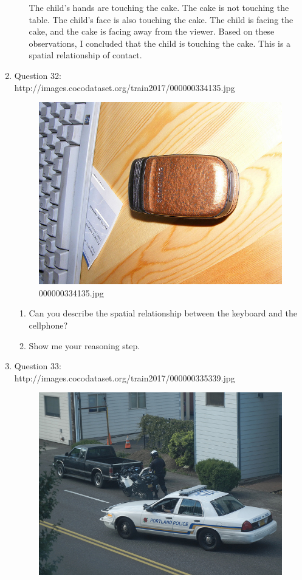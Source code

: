 \begin{enumerate}
\begin{enumerate}
        The child's hands are touching the cake.
        The cake is not touching the table.
        The child's face is also touching the cake.
        The child is facing the cake, and the cake is facing away from the viewer.
        Based on these observations, I concluded that the child is touching the cake. This is a spatial relationship of contact.
    \end{enumerate}
    \item Question 32:\\http://images.cocodataset.org/train2017/000000334135.jpg
    \begin{figure}[h]
        \centering
        \includegraphics[width=0.8\linewidth]{../image set/easy/000000334135.jpg}
        \caption{000000334135.jpg}
    \end{figure}
    \begin{enumerate}
        \item Can you describe the spatial relationship between the keyboard and the cellphone?
        \item Show me your reasoning step.
    \end{enumerate}
    \item Question 33:\\http://images.cocodataset.org/train2017/000000335339.jpg
    \begin{figure}[h]
        \centering
        \includegraphics[width=0.8\linewidth]{../image set/easy/000000335339.jpg}

\end{figure}
\end{enumerate}
